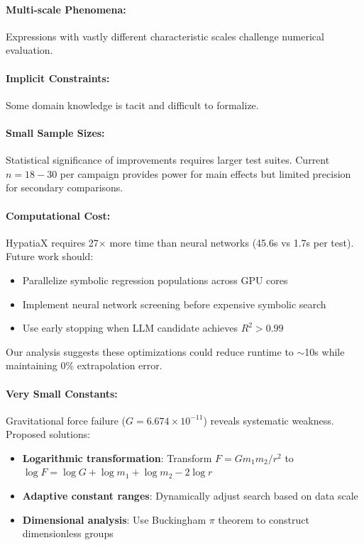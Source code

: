 \paragraph{Multi-scale Phenomena:} Expressions with vastly different characteristic scales challenge numerical evaluation.

\paragraph{Implicit Constraints:} Some domain knowledge is tacit and difficult to formalize.

\paragraph{Small Sample Sizes:} Statistical significance of improvements requires larger test suites. Current $n = 18-30$ per campaign provides power for main effects but limited precision for secondary comparisons.


\paragraph{Computational Cost:} HypatiaX requires 27$\times$ more time than neural networks (45.6s vs 1.7s per test). Future work should:
\begin{itemize}
\item Parallelize symbolic regression populations across GPU cores
\item Implement neural network screening before expensive symbolic search
\item Use early stopping when LLM candidate achieves $R^2 > 0.99$
\end{itemize}

Our analysis suggests these optimizations could reduce runtime to $\sim$10s while maintaining 0\% extrapolation error.

\paragraph{Very Small Constants:} Gravitational force failure ($G = 6.674 \times 10^{-11}$) reveals systematic weakness. Proposed solutions:
\begin{itemize}
\item \textbf{Logarithmic transformation}: Transform $F = Gm_1m_2/r^2$ to $\log F = \log G + \log m_1 + \log m_2 - 2\log r$
\item \textbf{Adaptive constant ranges}: Dynamically adjust search based on data scale
\item \textbf{Dimensional analysis}: Use Buckingham $\pi$ theorem to construct dimensionless groups
\end{itemize}

